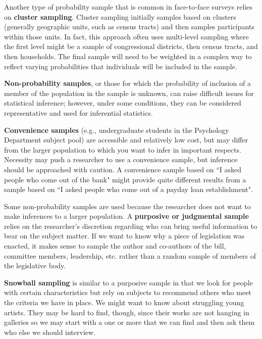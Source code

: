 \documentclass[11pt,openany]{book}\usepackage[]{graphicx}\usepackage[]{color}
\begin{document}
{Another type of probability sample that is common in face-to-face surveys relies on \textbf{cluster sampling}.  Cluster sampling initially samples based on clusters (generally geographic units, such as census tracts) and then samples participants within those units.  In fact, this approach often uses multi-level sampling where the first level might be a sample of congressional districts, then census tracts, and then households.  The final sample will need to be weighted in a complex way to reflect varying probabilities that individuals will be included in the sample.  
  
\textbf{Non-probability samples}, or those for which the probability of inclusion of a member of the population in the sample is unknown, can raise difficult issues for statistical inference; however, under some conditions, they can be considered representative and used for inferential statistics.

\textbf{Convenience samples} (e.g., undergraduate students in the Psychology Department subject pool) are accessible and relatively low cost, but may differ from the larger population to which you want to infer in important respects.   Necessity may push a researcher to use a convenience sample, but inference should be approached with caution.  A convenience sample based on ``I asked people who come out of the bank" might provide quite different results from a sample based on ``I asked people who come out of a payday loan establishment".

Some non-probability samples are used because the researcher does not want to make inferences to a larger population.  A \textbf{purposive or judgmental sample} relies on the researcher's discretion regarding who can bring useful information to bear on the subject matter.  If we want to know why a piece of legislation was enacted, it makes sense to sample the author and co-authors of the bill, committee members, leadership, etc. rather than a random sample of members of the legislative body.

\textbf{Snowball sampling} is similar to a purposive sample in that we look for people with certain characteristics but rely on subjects to recommend others who meet the criteria we have in place.  We might want to know about struggling young artists.  They may be hard to find, though, since their works are not hanging in galleries so we may start with a one or more that we can find and then ask them who else we should interview.
	
}
\end{document}
